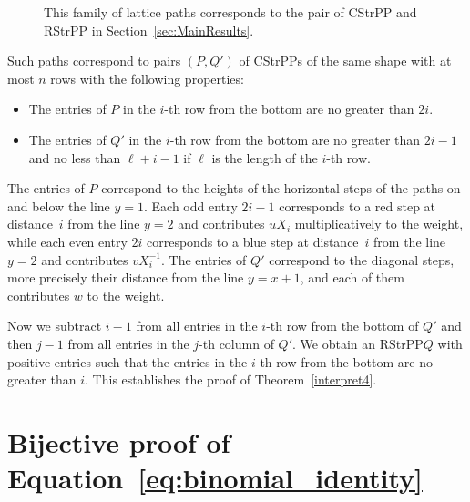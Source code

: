 \documentclass[12pt]{amsart}
\theoremstyle{definition}
\numberwithin{equation}{section}
\newcommand{\CSPP}{CStrPP\xspace}
\newcommand{\CSPPs}{CStrPPs\xspace}
\newcommand{\RSPP}{RStrPP\xspace}
\begin{document}
\begin{figure}[htb]
	\caption{\label{fig:signless} This family of lattice paths corresponds to the pair of \CSPP and \RSPP in Section~\ref{sec:MainResults}.}
\end{figure}

Such paths correspond to pairs $(P,Q')$ of \CSPPs of the same shape with at most $n$ rows with the following properties:
\begin{itemize}
	\item The entries of $P$ in the $i$-th row from the bottom are no greater than $2i$.
	\item The entries of $Q'$ in the $i$-th row from the bottom are no greater than $2i-1$ and no less than $\ell + i -1$ 
	if $\ell$ is the length of the $i$-th row.
\end{itemize} 
The entries of $P$ correspond to the heights of the horizontal steps of the paths on and below the line $y=1$. Each odd entry $2i-1$ corresponds to a red step at distance~$i$ from the line $y=2$ and contributes $u X_i$ multiplicatively to the weight, while each even entry $2i$ corresponds to a blue step at distance~$i$ from the line $y=2$ and contributes $v X_i^{-1}$.  The entries of $Q'$ correspond to the diagonal steps, more precisely their distance from the line $y=x+1$, and each of them contributes $w$ to the weight.

Now we subtract $i-1$ from all entries in the $i$-th row from the bottom of $Q'$ and then $j-1$ from all entries in the $j$-th column of $Q'$. We obtain an \RSPP $Q$ with positive entries such that the entries in the $i$-th row from the bottom are no greater than $i$. This establishes the proof of Theorem~\ref{interpret4}.

\section{\texorpdfstring{Bijective proof of Equation~\eqref{eq:binomial_identity}}{Bijective proof of Equation~(4.8)}}\label{ap:bijective_proofs}
\end{document}
